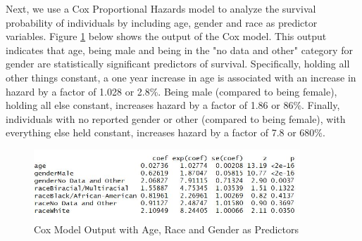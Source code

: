 \documentclass[twoside,10.5pt]{article}
\begin{document}
\begin{table}[h!]
  \begin{center}
    \caption{Probability of survival by Race}
    \label{tab:km_race}
  \end{center}
\end{table}

Next, we use a Cox Proportional Hazards model to analyze the survival probability of individuals by including age, gender and race as predictor variables. Figure \ref{fig:cox_model} below shows the output of the Cox model. This output indicates that age, being male and being in the "no data and other" category for gender are statistically significant predictors of survival. Specifically, holding all other things constant, a one year increase in age is associated with an increase in hazard by a factor of 1.028 or 2.8\%. Being male (compared to being female), holding all else constant, increases hazard by a factor of 1.86 or 86\%. Finally, individuals with no reported gender or other (compared to being female), with everything else held constant, increases hazard by a factor of 7.8 or 680\%. 

\begin{figure}[htp]
\centering
\includegraphics[width=10cm]{images/cox_model.JPG}
\caption{Cox Model Output with Age, Race and Gender as Predictors}
\label{fig:cox_model}
\end{figure}
\end{document}
